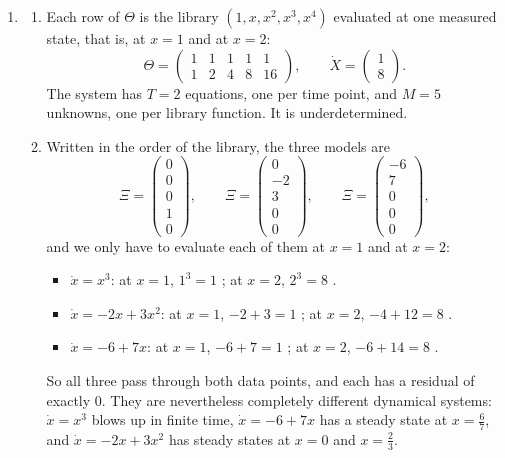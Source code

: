 \documentclass[a4paper,12pt]{article}
\begin{document}
\begin{enumerate}[label=(\alph*)]
There is a second reason. An overdetermined system has a unique least-squares solution (when $\Theta$ has full column rank), so the output of the method is well defined: run it twice on the same data and you get the same model.

\item
\begin{enumerate}[label=(\roman*)]
\item Each row of $\Theta$ is the library $\left( 1, x, x^2, x^3, x^4 \right)$ evaluated at one measured state, that is, at $x=1$ and at $x=2$:
\[ \Theta = \begin{pmatrix} 1 & 1 & 1 & 1 & 1\\ 1 & 2 & 4 & 8 & 16 \end{pmatrix},
\qquad
\dot{X} = \begin{pmatrix} 1\\ 8 \end{pmatrix} . \]
The system has $T=2$ equations, one per time point, and $M=5$ unknowns, one per library function. It is underdetermined.

\item Written in the order of the library, the three models are
\[ \Xi = \begin{pmatrix} 0\\ 0\\ 0\\ 1\\ 0 \end{pmatrix},
\qquad
\Xi = \begin{pmatrix} 0\\ -2\\ 3\\ 0\\ 0 \end{pmatrix},
\qquad
\Xi = \begin{pmatrix} -6\\ 7\\ 0\\ 0\\ 0 \end{pmatrix} , \]
and we only have to evaluate each of them at $x=1$ and at $x=2$:
\begin{itemize}
\item $\dot{x}=x^3$: at $x=1$, $1^3=1$ \checkmark; at $x=2$, $2^3=8$ \checkmark.
\item $\dot{x}=-2x+3x^2$: at $x=1$, $-2+3=1$ \checkmark; at $x=2$, $-4+12=8$ \checkmark.
\item $\dot{x}=-6+7x$: at $x=1$, $-6+7=1$ \checkmark; at $x=2$, $-6+14=8$ \checkmark.
\end{itemize}
So all three pass through both data points, and each has a residual of exactly $0$. They are nevertheless completely different dynamical systems: $\dot{x}=x^3$ blows up in finite time, $\dot{x}=-6+7x$ has a steady state at $x=\frac{6}{7}$, and $\dot{x}=-2x+3x^2$ has steady states at $x=0$ and $x=\frac{2}{3}$.


\end{enumerate}
\end{enumerate}
\end{document}
